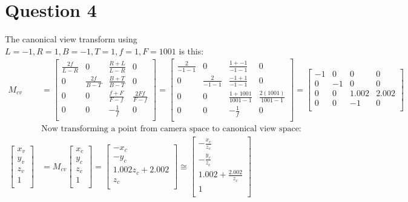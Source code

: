 \documentclass{article} %
\begin{document}
\section{Question 4}
The canonical view transform using $L=-1, R = 1, B = -1, T = 1, f = 1, F=1001$ is this:
\begin{align*}
M_{cv} &=
\begin{bmatrix}
\frac{2f}{L-R} & 0 & \frac{R + L}{L - R} & 0\\
0 & \frac{2f}{B-T} & \frac{B + T}{B - T} & 0\\
0 & 0 & \frac{f + F}{F - f} & \frac{2Ff}{F - f}\\
0 & 0 & -\frac{1}{f} & 0\\
\end{bmatrix}
= \begin{bmatrix}
\frac{2}{-1-1} & 0 & \frac{1 + -1}{-1 - 1} & 0\\
0 & \frac{2}{-1-1} & \frac{-1 + 1}{-1 - 1} & 0\\
0 & 0 & \frac{1 + 1001}{1001 - 1} & \frac{2(1001)}{1001 - 1}\\
0 & 0 & -\frac{1}{f} & 0\\
\end{bmatrix}
=
\begin{bmatrix}
-1 & 0 & 0 & 0\\
0 & -1 & 0 & 0\\
0 & 0 & 1.002 & 2.002\\
0 & 0 & -1 & 0\\
\end{bmatrix}\\
&\text{Now transforming a point from camera space to canonical view space:}\\
\begin{bmatrix}
x_v\\
y_v\\
z_v\\
1\\
\end{bmatrix}
&= M_{cv} \begin{bmatrix}
x_c\\
y_c\\
z_c\\
1\\
\end{bmatrix}
= \begin{bmatrix}
-x_c\\
-y_c\\
1.002 z_c + 2.002\\
z_c\\
\end{bmatrix}
\cong
\begin{bmatrix}
-\frac{x_c}{z_c}\\
-\frac{y_c}{z_c}\\
1.002 + \frac{2.002}{z_c}\\
1\\
\end{bmatrix}
\end{align*}
\end{document}
